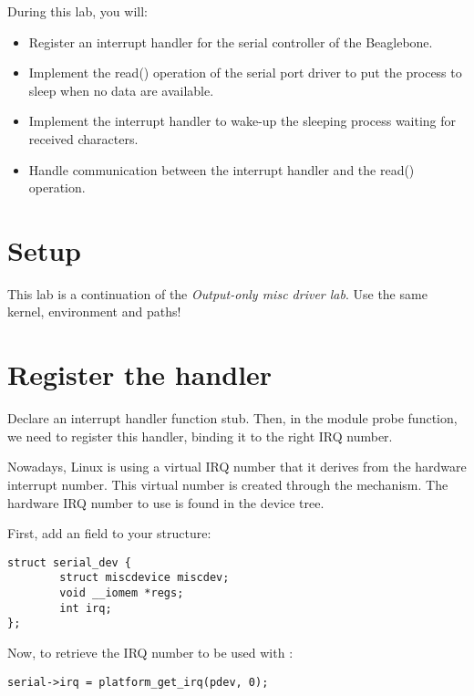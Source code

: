 
During this lab, you will:

\begin{itemize}
\item Register an interrupt handler for the serial controller of the
  Beaglebone.
\item Implement the read() operation of the serial port driver to put
  the process to sleep when no data are available.
\item Implement the interrupt handler to wake-up the sleeping process
  waiting for received characters.
\item Handle communication between the interrupt handler and the
  read() operation.
\end{itemize}

\section{Setup}

This lab is a continuation of the {\em Output-only misc driver
lab}. Use the same kernel, environment and paths!

\section{Register the handler}

Declare an interrupt handler function stub. Then, in the module probe
function, we need to register this handler, binding it to the right
IRQ number.

Nowadays, Linux is using a virtual IRQ number that it derives from the
hardware interrupt number. This virtual number is created through the
 mechanism. The hardware IRQ number to use is found in
the device tree.

First, add an  field to your  structure:

\begin{verbatim}
struct serial_dev {
        struct miscdevice miscdev;
        void __iomem *regs;
        int irq;
};
\end{verbatim}

Now, to retrieve the IRQ number to be used with :

\begin{verbatim}
serial->irq = platform_get_irq(pdev, 0);
\end{verbatim}


